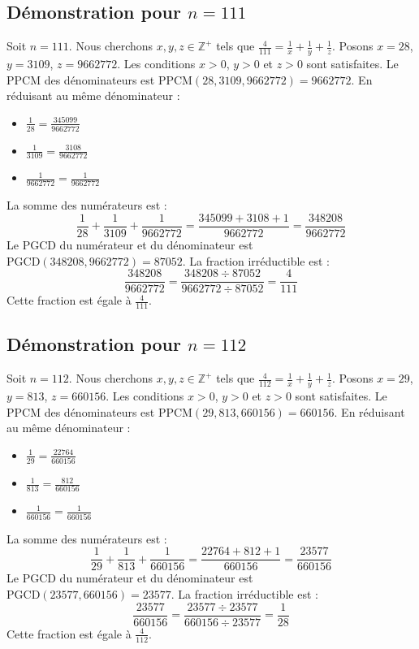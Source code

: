 \documentclass[11pt,a4paper]{article}
\begin{document}
\subsection{Démonstration pour $n = 111$}
Soit $n = 111$. Nous cherchons $x, y, z \in \mathbb{Z}^{+}$ tels que $\frac{4}{111} = \frac{1}{x} + \frac{1}{y} + \frac{1}{z}$.
Posons $x = 28$, $y = 3109$, $z = 9662772$.
Les conditions $x > 0$, $y > 0$ et $z > 0$ sont satisfaites.
Le PPCM des dénominateurs est $\text{PPCM}(28, 3109, 9662772) = 9662772$.
En réduisant au même dénominateur :
\begin{itemize}
    \item $\frac{1}{28} = \frac{345099}{9662772}$
    \item $\frac{1}{3109} = \frac{3108}{9662772}$
    \item $\frac{1}{9662772} = \frac{1}{9662772}$
\end{itemize}
La somme des numérateurs est :
$$ \frac{1}{28} + \frac{1}{3109} + \frac{1}{9662772} = \frac{345099 + 3108 + 1}{9662772} = \frac{348208}{9662772} $$
Le PGCD du numérateur et du dénominateur est $\text{PGCD}(348208, 9662772) = 87052$.
La fraction irréductible est :
$$ \frac{348208}{9662772} = \frac{348208 \div 87052}{9662772 \div 87052} = \frac{4}{111} $$
Cette fraction est égale à $\frac{4}{111}$.

\subsection{Démonstration pour $n = 112$}
Soit $n = 112$. Nous cherchons $x, y, z \in \mathbb{Z}^{+}$ tels que $\frac{4}{112} = \frac{1}{x} + \frac{1}{y} + \frac{1}{z}$.
Posons $x = 29$, $y = 813$, $z = 660156$.
Les conditions $x > 0$, $y > 0$ et $z > 0$ sont satisfaites.
Le PPCM des dénominateurs est $\text{PPCM}(29, 813, 660156) = 660156$.
En réduisant au même dénominateur :
\begin{itemize}
    \item $\frac{1}{29} = \frac{22764}{660156}$
    \item $\frac{1}{813} = \frac{812}{660156}$
    \item $\frac{1}{660156} = \frac{1}{660156}$
\end{itemize}
La somme des numérateurs est :
$$ \frac{1}{29} + \frac{1}{813} + \frac{1}{660156} = \frac{22764 + 812 + 1}{660156} = \frac{23577}{660156} $$
Le PGCD du numérateur et du dénominateur est $\text{PGCD}(23577, 660156) = 23577$.
La fraction irréductible est :
$$ \frac{23577}{660156} = \frac{23577 \div 23577}{660156 \div 23577} = \frac{1}{28} $$
Cette fraction est égale à $\frac{4}{112}$.
\end{document}
